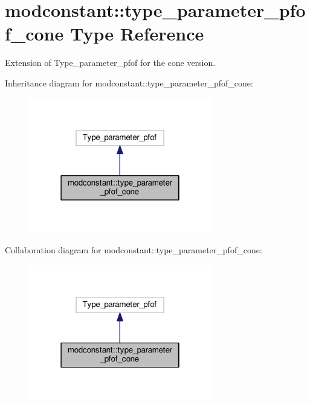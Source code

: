 \hypertarget{structmodconstant_1_1type__parameter__pfof__cone}{\section{modconstant\-:\-:type\-\_\-parameter\-\_\-pfof\-\_\-cone Type Reference}
\label{structmodconstant_1_1type__parameter__pfof__cone}
}


Extension of Type\-\_\-parameter\-\_\-pfof for the cone version.  




Inheritance diagram for modconstant\-:\-:type\-\_\-parameter\-\_\-pfof\-\_\-cone\-:\nopagebreak
\begin{figure}[H]
\begin{center}
\leavevmode
\includegraphics[width=226pt]{structmodconstant_1_1type__parameter__pfof__cone__inherit__graph}
\end{center}
\end{figure}


Collaboration diagram for modconstant\-:\-:type\-\_\-parameter\-\_\-pfof\-\_\-cone\-:\nopagebreak
\begin{figure}[H]
\begin{center}
\leavevmode
\includegraphics[width=226pt]{structmodconstant_1_1type__parameter__pfof__cone__coll__graph}
\end{center}
\end{figure}
